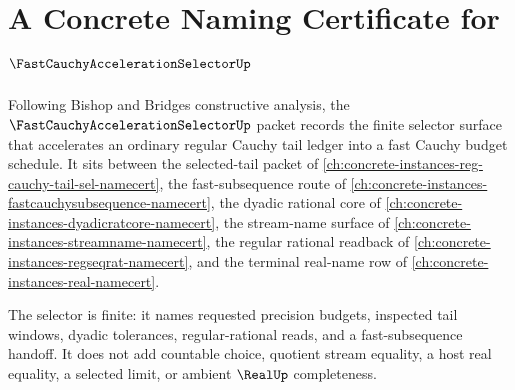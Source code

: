 \chapter{A Concrete Naming Certificate for $\FastCauchyAccelerationSelectorUp$}
\label{ch:concrete-instances-fast-cauchy-acceleration-selector-namecert}

Following Bishop and Bridges constructive analysis, the $\FastCauchyAccelerationSelectorUp$ packet records the finite selector surface that accelerates an ordinary regular Cauchy tail ledger into a fast Cauchy budget schedule. It sits between the selected-tail packet of \autoref{ch:concrete-instances-reg-cauchy-tail-sel-namecert}, the fast-subsequence route of \autoref{ch:concrete-instances-fastcauchysubsequence-namecert}, the dyadic rational core of \autoref{ch:concrete-instances-dyadicratcore-namecert}, the stream-name surface of \autoref{ch:concrete-instances-streamname-namecert}, the regular rational readback of \autoref{ch:concrete-instances-regseqrat-namecert}, and the terminal real-name row of \autoref{ch:concrete-instances-real-namecert}.

The selector is finite: it names requested precision budgets, inspected tail windows, dyadic tolerances, regular-rational reads, and a fast-subsequence handoff. It does not add countable choice, quotient stream equality, a host real equality, a selected limit, or ambient $\RealUp$ completeness.

